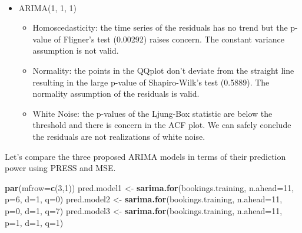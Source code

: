 \documentclass[]{article}
\newenvironment{Shaded}{\begin{snugshade}}{\end{snugshade}}
\newcommand{\DataTypeTok}[1]{\textcolor[rgb]{0.13,0.29,0.53}{#1}}
\newcommand{\DecValTok}[1]{\textcolor[rgb]{0.00,0.00,0.81}{#1}}
\newcommand{\KeywordTok}[1]{\textcolor[rgb]{0.13,0.29,0.53}{\textbf{#1}}}
\newcommand{\NormalTok}[1]{#1}
\newcommand{\StringTok}[1]{\textcolor[rgb]{0.31,0.60,0.02}{#1}}
\providecommand{\tightlist}{%
  \setlength{\itemsep}{0pt}\setlength{\parskip}{0pt}}
\begin{document}
\(\;\)

\begin{itemize}
\tightlist
\item
  ARIMA(1, 1, 1)

  \begin{itemize}
  \tightlist
  \item
    Homoscedasticity: the time series of the residuals has no trend but
    the p-value of Fligner's test (0.00292) raises concern. The constant
    variance assumption is not valid.
  \item
    Normality: the points in the QQplot don't deviate from the straight
    line resulting in the large p-value of Shapiro-Wilk's test (0.5889).
    The normality assumption of the residuals is valid.
  \item
    White Noise: the p-values of the Ljung-Box statistic are below the
    threshold and there is concern in the ACF plot. We can safely
    conclude the residuals are not realizations of white noise.
  \end{itemize}
\end{itemize}

\newpage

Let's compare the three proposed ARIMA models in terms of their
prediction power using PRESS and MSE.

\begin{Shaded}
\begin{Highlighting}[]
\KeywordTok{par}\NormalTok{(}\DataTypeTok{mfrow=}\KeywordTok{c}\NormalTok{(}\DecValTok{3}\NormalTok{,}\DecValTok{1}\NormalTok{))}
\NormalTok{pred.model1 <-}\StringTok{ }\KeywordTok{sarima.for}\NormalTok{(bookings.training, }\DataTypeTok{n.ahead=}\DecValTok{11}\NormalTok{, }\DataTypeTok{p=}\DecValTok{6}\NormalTok{, }\DataTypeTok{d=}\DecValTok{1}\NormalTok{, }\DataTypeTok{q=}\DecValTok{0}\NormalTok{)}
\NormalTok{pred.model2 <-}\StringTok{ }\KeywordTok{sarima.for}\NormalTok{(bookings.training, }\DataTypeTok{n.ahead=}\DecValTok{11}\NormalTok{, }\DataTypeTok{p=}\DecValTok{0}\NormalTok{, }\DataTypeTok{d=}\DecValTok{1}\NormalTok{, }\DataTypeTok{q=}\DecValTok{7}\NormalTok{)}
\NormalTok{pred.model3 <-}\StringTok{ }\KeywordTok{sarima.for}\NormalTok{(bookings.training, }\DataTypeTok{n.ahead=}\DecValTok{11}\NormalTok{, }\DataTypeTok{p=}\DecValTok{1}\NormalTok{, }\DataTypeTok{d=}\DecValTok{1}\NormalTok{, }\DataTypeTok{q=}\DecValTok{1}\NormalTok{)}
\end{Highlighting}
\end{Shaded}
\end{document}
